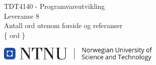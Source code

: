 \begin{titlepage}

    \begin{center}

        {\LARGE TDT4140 - Programvareutvikling\\[0.25em]Leveranse 8}
        \\[4em]

        {
        Antall ord utenom forside og referanser
        \\\{ ord \}
        }

        \vfill
        
        \includegraphics[width=8cm]{ntnu.pdf}
        
        
    \end{center}
    
    \thispagestyle{empty}
    \addtocounter{page}{-1}

\end{titlepage}
    